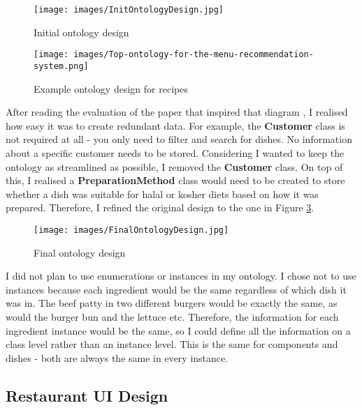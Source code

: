 \begin{figure}[h]
    \centering
    \captionsetup{justification=centering}
    \texttt{[image: images/InitOntologyDesign.jpg]}
    \caption{Initial ontology design}
    \label{fig:init_ontology_design}
\end{figure}

\begin{figure}[h]
    \centering
    \captionsetup{justification=centering}
    \texttt{[image: images/Top-ontology-for-the-menu-recommendation-system.png]}
    \caption{Example ontology design for recipes\cite{ontology_pitfalls}}
    \label{fig:recipe_ontology_design}
\end{figure}

After reading the evaluation of the paper that inspired that diagram \cite{ontology_pitfalls}, I realised how easy it was to create redundant data. For example, the \textbf{Customer} class is not required at all - you only need to filter and search for dishes. No information about a specific customer needs to be stored. Considering I wanted to keep the ontology as streamlined as possible, I removed the \textbf{Customer} class. On top of this, I realised a \textbf{PreparationMethod} class would need to be created to store whether a dish was suitable for halal or kosher diets based on how it was prepared. Therefore, I refined the original design to the one in Figure \ref{fig:final_ontology_design}.

\begin{figure}[h]
    \centering
    \captionsetup{justification=centering}
    \texttt{[image: images/FinalOntologyDesign.jpg]}
    \caption{Final ontology design}
    \label{fig:final_ontology_design}
\end{figure}

I did not plan to use enumerations or instances in my ontology. I chose not to use instances because each ingredient would be the same regardless of which dish it was in. The beef patty in two different burgers would be exactly the same, as would the burger bun and the lettuce etc. Therefore, the information for each ingredient instance would be the same, so I could define all the information on a class level rather than an instance level. This is the same for components and dishes - both are always the same in every instance.

\subsection{Restaurant UI Design}

